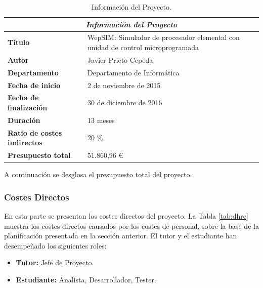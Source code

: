 \begin{center}
\begin{table}[htbp]
\centering
\caption{Información del Proyecto.}
\begin{tabular}{@{}p{3.5cm} p{9cm}@{}} 
\toprule
\multicolumn{2}{c}{\textbf{\textit{Información del Proyecto}}}\\
\midrule
\textbf{Título} 					& WepSIM: Simulador de procesador elemental con unidad de control microprogramada \\
\midrule
\textbf{Autor} 					& Javier Prieto Cepeda \\
\midrule
\textbf{Departamento} 				& Departamento de Informática \\
\midrule
\textbf{Fecha de inicio}				&2 de noviembre de 2015 \\
\midrule
\textbf{Fecha de finalización}				& 30 de diciembre de 2016 \\
\midrule
\textbf{Duración} 				& 13 meses \\
\midrule
\textbf{Ratio de costes indirectos} 	& 20 \% \\
\midrule
\textbf{Presupuesto total} 			& 51.860,96 \euro \\
\bottomrule
\end{tabular}
\label{tab:project_information}
\end{table}
\end{center}

\vspace{5cm}

A continuación se desglosa el presupuesto total del proyecto.

\subsubsection{Costes Directos}

En esta parte se presentan los costes directos del proyecto. La Tabla \ref{tab:dhrc} muestra los costes directos causados por los costes de personal, sobre la base de la planificación presentada en la sección anterior. El tutor y el estudiante han desempeñado los siguientes roles:

\begin{itemize}

\item \textbf{Tutor:} Jefe de Proyecto.

\item \textbf{Estudiante:} Analista, Desarrollador, Tester.

\end{itemize} 

